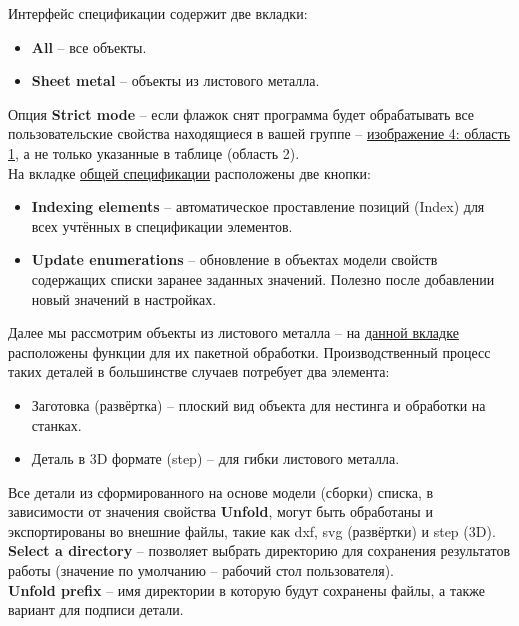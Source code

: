 \documentclass[a4paper,12pt]{article}
\begin{document}
\pagebreak

Интерфейс спецификации содержит две вкладки:
\begin{itemize}
	\item \textbf{All} -- все объекты.
	\item \textbf{Sheet metal} -- объекты из листового металла.
\end{itemize}

Опция \textbf{Strict mode} -- если флажок снят программа будет обрабатывать все пользовательские свойства находящиеся в вашей группе -- \hyperref[sec:pref_specification]{изображение 4: область 1}, а не только указанные в таблице (область 2).\\

На вкладке \hyperref[sec:specification_all]{общей спецификации} расположены две кнопки:
\begin{itemize}
	\item \textbf{Indexing elements} -- автоматическое проставление позиций (Index) для всех учтённых в спецификации элементов.
	\item \textbf{Update enumerations} -- обновление в объектах модели свойств содержащих списки заранее заданных значений. Полезно после добавлении новый значений в настройках.
\end{itemize}

Далее мы рассмотрим объекты из листового металла -- на \hyperref[sec:specification_sm]{данной вкладке} расположены функции для их пакетной обработки. Производственный процесс таких деталей в большинстве случаев потребует два элемента:
\begin{itemize}
	\item Заготовка (развёртка) -- плоский вид объекта для нестинга и обработки на станках.
	\item Деталь в 3D формате (step) -- для гибки листового металла.
\end{itemize}

Все детали из сформированного на основе модели (сборки) списка, в зависимости от значения свойства \textbf{Unfold}, могут быть обработаны и экспортированы во внешние файлы, такие как dxf, svg (развёртки) и step (3D).\\

\textbf{Select a directory} -- позволяет выбрать директорию для сохранения результатов работы (значение по умолчанию -- рабочий стол пользователя).\\

\textbf{Unfold prefix} -- имя директории в которую будут сохранены файлы, а также вариант для подписи детали.\\
\end{document}
